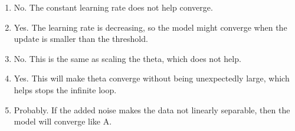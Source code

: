 \begin{answer}
    \begin{enumerate}
        \item No. The constant learning rate does not help converge.
        \item Yes. The learning rate is decreasing, so the model might converge when the update is smaller than the threshold.
        \item No. This is the same as scaling the theta, which does not help.
        \item Yes. This will make theta converge without being unexpectedly large, which helps stops the infinite loop.
        \item Probably. If the added noise makes the data not linearly separable, then the model will converge like A.
    \end{enumerate}
\end{answer}
